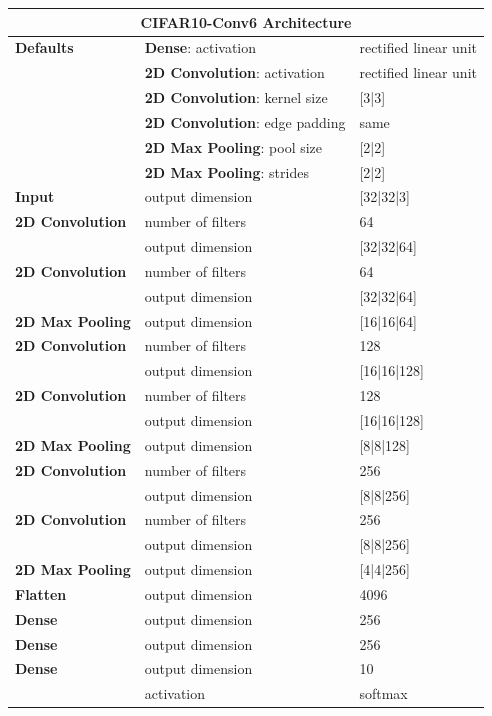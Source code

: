 	\begin{tabularx}{\textwidth}[!h]{X X X}
		\multicolumn{3}{c}{\textbf{CIFAR10-Conv6 Architecture}}
		\\
		\hline
		\endhead
		\textbf{Defaults} & \textbf{Dense}: activation & rectified linear unit\\
		& \textbf{2D Convolution}: activation & rectified linear unit\\
		& \textbf{2D Convolution}: kernel size & [3|3]\\
		& \textbf{2D Convolution}: edge padding & same\\
		& \textbf{2D Max Pooling}: pool size & [2|2]\\
		& \textbf{2D Max Pooling}: strides & [2|2]\\
		\hline
		\textbf{Input} & output dimension & [32|32|3]\\
		[8pt]
		\textbf{2D Convolution} & number of filters & 64\\
		& output dimension & [32|32|64]\\
		[8pt]
		\textbf{2D Convolution} & number of filters & 64\\
		& output dimension & [32|32|64]\\
		[8pt]
		\textbf{2D Max Pooling} & output dimension & [16|16|64]\\
		[8pt]
		\textbf{2D Convolution} & number of filters & 128\\
		& output dimension & [16|16|128]\\
		[8pt]
		\textbf{2D Convolution} & number of filters & 128\\
		& output dimension & [16|16|128]\\
		[8pt]
		\textbf{2D Max Pooling} & output dimension & [8|8|128]\\
		[8pt]
		\textbf{2D Convolution} & number of filters & 256\\
		& output dimension & [8|8|256]\\
		[8pt]
		\textbf{2D Convolution} & number of filters & 256\\
		& output dimension & [8|8|256]\\
		[8pt]
		\textbf{2D Max Pooling} & output dimension & [4|4|256]\\
		[8pt]
		\textbf{Flatten} & output dimension & 4096\\
		[8pt]
		\textbf{Dense} & output dimension & 256\\
		[8pt]
		\textbf{Dense} & output dimension & 256\\
		[8pt]
		\textbf{Dense} & output dimension & 10\\
		& activation & softmax\\
		\hline
	\end{tabularx}

